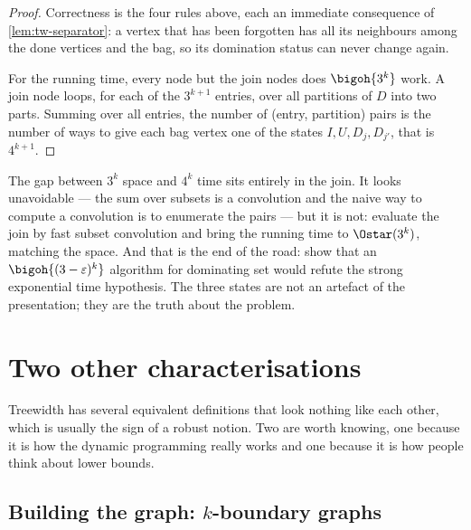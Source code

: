 \begin{proof}
Correctness is the four rules above, each an immediate consequence of
\cref{lem:tw-separator}: a vertex that has been forgotten has all its
neighbours among the done vertices and the bag, so its domination status can
never change again.

For the running time, every node but the join nodes does $\bigoh{3^k}$ work.
A join node loops, for each of the $3^{k+1}$ entries, over all partitions of $D$
into two parts. Summing over all entries, the number of (entry, partition) pairs
is the number of ways to give each bag vertex one of the states
$I, U, D_j, D_{j'}$, that is $4^{k+1}$.
\end{proof}

\begin{intuition}
The gap between $3^k$ space and $4^k$ time sits entirely in the join. It looks
unavoidable --- the sum over subsets is a convolution and the naive way to
compute a convolution is to enumerate the pairs --- but it is not:
\citet{VanRooijBodlaenderRossmanith2009} evaluate the join by fast subset
convolution and bring the running time to $\Ostar(3^k)$, matching the space.
And that is the end of the road: \citet{LokshtanovMarxSaurabh2018} show that an
$\bigoh{(3-\varepsilon)^k}$ algorithm for dominating set would refute the strong
exponential time hypothesis. The three states are not an artefact of the
presentation; they are the truth about the problem.
\end{intuition}

\section{Two other characterisations}
\label{sec:tw-characterisations}

Treewidth has several equivalent definitions that look nothing like each other,
which is usually the sign of a robust notion. Two are worth knowing, one because
it is how the dynamic programming really works and one because it is how people
think about lower bounds.

\subsection{\texorpdfstring{Building the graph: $k$-boundary graphs}{Building the graph: k-boundary graphs}}

